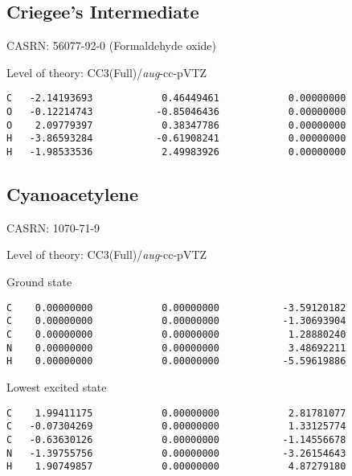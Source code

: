 \documentclass[journal=jctcce,manuscript=article,layout=traditional]{achemso}
\newcommand{\AVTZ}{\emph{aug}-cc-pVTZ}
\begin{document}
\subsection{Criegee's Intermediate}

CASRN: 56077-92-0 (Formaldehyde oxide)

\begin{singlespace}
\noindent Level of theory: CC3(Full)/{\AVTZ}
\begin{verbatim}
C   -2.14193693            0.46449461            0.00000000
O   -0.12214743           -0.85046436            0.00000000
O    2.09779397            0.38347786            0.00000000
H   -3.86593284           -0.61908241            0.00000000
H   -1.98533536            2.49983926            0.00000000
\end{verbatim}
\end{singlespace}

\subsection{Cyanoacetylene}

CASRN: 1070-71-9

\begin{singlespace}
\noindent Level of theory: CC3(Full)/{\AVTZ}
\end{singlespace}

\begin{singlespace}
\noindent Ground state
\begin{verbatim}
C    0.00000000            0.00000000           -3.59120182
C    0.00000000            0.00000000           -1.30693904
C    0.00000000            0.00000000            1.28880240
N    0.00000000            0.00000000            3.48692211
H    0.00000000            0.00000000           -5.59619886
\end{verbatim}
\end{singlespace}

\begin{singlespace}
\noindent Lowest excited state
\begin{verbatim}
C    1.99411175            0.00000000            2.81781077
C   -0.07304269            0.00000000            1.33125774
C   -0.63630126            0.00000000           -1.14556678
N   -1.39755756            0.00000000           -3.26154643
H    1.90749857            0.00000000            4.87279180
\end{verbatim}
\end{singlespace}
\end{document}
